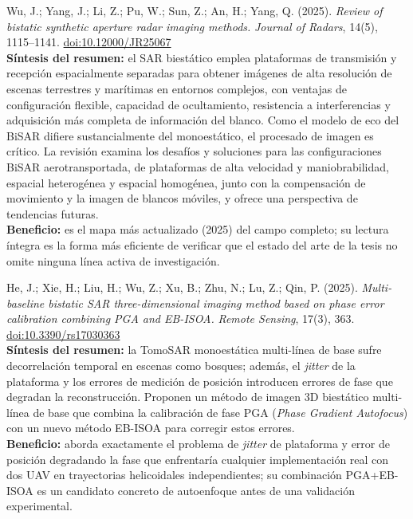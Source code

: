 \documentclass[11pt,a4paper]{report}
\begin{document}
\begin{enumerate}[label=\textbf{[C\arabic*]}, leftmargin=2.2cm, itemsep=10pt]
\item Wu, J.; Yang, J.; Li, Z.; Pu, W.; Sun, Z.; An, H.; Yang, Q. (2025).
\textit{Review of bistatic synthetic aperture radar imaging methods.}
\emph{Journal of Radars}, 14(5), 1115--1141.
\href{https://doi.org/10.12000/JR25067}{doi:10.12000/JR25067}
\cite{wu2025}\\
\textbf{Síntesis del resumen:} el SAR biestático emplea plataformas de
transmisión y recepción espacialmente separadas para obtener imágenes de
alta resolución de escenas terrestres y marítimas en entornos complejos,
con ventajas de configuración flexible, capacidad de ocultamiento,
resistencia a interferencias y adquisición más completa de información del
blanco. Como el modelo de eco del BiSAR difiere sustancialmente del
monoestático, el procesado de imagen es crítico. La revisión examina los
desafíos y soluciones para las configuraciones BiSAR aerotransportada, de
plataformas de alta velocidad y maniobrabilidad, espacial heterogénea y
espacial homogénea, junto con la compensación de movimiento y la imagen de
blancos móviles, y ofrece una perspectiva de tendencias futuras.\\
\textbf{Beneficio:} es el mapa más actualizado (2025) del campo completo;
su lectura íntegra es la forma más eficiente de verificar que el estado del
arte de la tesis no omite ninguna línea activa de investigación.

\item He, J.; Xie, H.; Liu, H.; Wu, Z.; Xu, B.; Zhu, N.; Lu, Z.; Qin, P.
(2025). \textit{Multi-baseline bistatic SAR three-dimensional imaging
method based on phase error calibration combining PGA and EB-ISOA.}
\emph{Remote Sensing}, 17(3), 363.
\href{https://doi.org/10.3390/rs17030363}{doi:10.3390/rs17030363}
\cite{he2025}\\
\textbf{Síntesis del resumen:} la TomoSAR monoestática multi-línea de base
sufre decorrelación temporal en escenas como bosques; además, el
\emph{jitter} de la plataforma y los errores de medición de posición
introducen errores de fase que degradan la reconstrucción. Proponen un
método de imagen 3D biestático multi-línea de base que combina la
calibración de fase PGA (\emph{Phase Gradient Autofocus}) con un nuevo
método EB-ISOA para corregir estos errores.\\
\textbf{Beneficio:} aborda exactamente el problema de \emph{jitter} de
plataforma y error de posición degradando la fase que enfrentaría cualquier
implementación real con dos UAV en trayectorias helicoidales
independientes; su combinación PGA+EB-ISOA es un candidato concreto de
autoenfoque antes de una validación experimental.


\end{enumerate}
\end{document}
